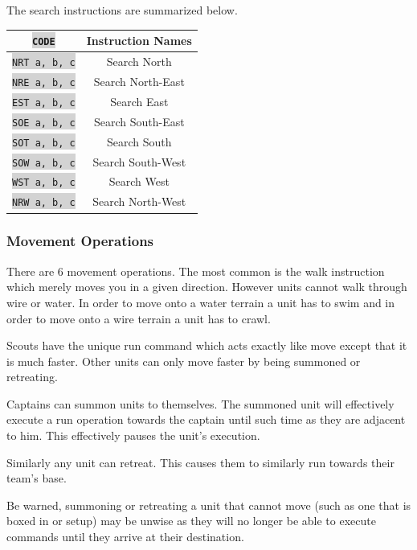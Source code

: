 \documentclass{article}
\newcommand{\vnscode}[1]{\colorbox{lightgray}{\lstinline[language=vns]{#1}}}
\begin{document}
The search instructions are summarized below.

\begin{minipage}{\textwidth}
\label{table:search}
\centering
\begin{tabular}{|c|c|}
    \hline \vnscode{CODE} & Instruction Names \\ \hline
    \vnscode{NRT a, b, c} & Search North \\ \hline
    \vnscode{NRE a, b, c} & Search North-East \\ \hline
    \vnscode{EST a, b, c} & Search East \\ \hline
    \vnscode{SOE a, b, c} & Search South-East \\ \hline
    \vnscode{SOT a, b, c} & Search South \\ \hline
    \vnscode{SOW a, b, c} & Search South-West \\ \hline
    \vnscode{WST a, b, c} & Search West \\ \hline
    \vnscode{NRW a, b, c} & Search North-West \\ \hline
\end{tabular}
\end{minipage}

\subsubsection{Movement Operations}

There are 6 movement operations. The most common is the walk instruction which
merely moves you in a given direction. However units cannot walk through wire or
water. In order to move onto a water terrain a unit has to swim and in order to
move onto a wire terrain a unit has to crawl.

Scouts have the unique run command which acts exactly like move except that it
is much faster. Other units can only move faster by being summoned or
retreating.

Captains can summon units to themselves. The summoned unit will effectively
execute a run operation towards the captain until such time as they are adjacent
to him. This effectively pauses the unit's execution.

Similarly any unit can retreat. This causes them to similarly run towards their
team's base.

Be warned, summoning or retreating a unit that cannot move (such as one that is
boxed in or setup) may be unwise as they will no longer be able to execute
commands until they arrive at their destination.
\end{document}

